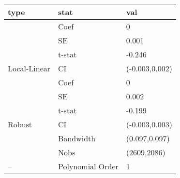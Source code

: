 
\begin{tabular}{lll}
\toprule
type & stat & val\\
\midrule
 & Coef & 0\\

 & SE & 0.001\\

 & t-stat & -0.246\\

\multirow{-4}{*}{\raggedright\arraybackslash Local-Linear} & CI & (-0.003,0.002)\\
\cmidrule{1-3}
 & Coef & 0\\

 & SE & 0.002\\

 & t-stat & -0.199\\

\multirow{-4}{*}{\raggedright\arraybackslash Robust} & CI & (-0.003,0.003)\\
\cmidrule{1-3}
 & Bandwidth & (0.097,0.097)\\

 & Nobs & (2609,2086)\\

\multirow{-3}{*}{\raggedright\arraybackslash --} & Polynomial Order & 1\\
\bottomrule
\end{tabular}